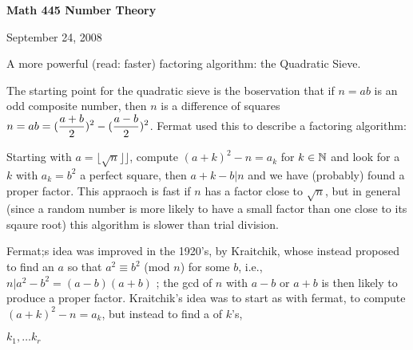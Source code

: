 





\loadmsbm

\nopagenumbers
\overfullrule=0pt


\def\ctln{\centerline}
\def\u{\underbar}
\def\ssk{\smallskip}
\def\msk{\medskip}
\def\bsk{\bigskip}
\def\dl{\displaystyle}
\def\ni{\noindent}


\ctln{\bf Math 445 Number Theory}

\medskip

\ctln{September 24, 2008}

\bigskip

A more powerful (read: faster) factoring algorithm: the Quadratic Sieve.

\ssk

The starting point for the quadratic sieve is the boservation that if $n=ab$ is an odd composite number, then 
$n$ is a difference of squares $\dl n=ab=({{a+b}\over{2}})^2-({{a-b}\over{2}})^2$. Fermat used this to describe a factoring algorithm:

\ssk

Starting with $a=\lfloor\sqrt{n}\rfloor\rfloor$, compute $(a+k)^2-n=a_k$ for $k\in{\Bbb N}$ and look for a $k$ with $a_k=b^2$ a perfect square,
then $a+k-b|n$ and we have (probably) found a proper factor. This appraoch is fast if $n$ has a factor close to $\sqrt{n}$, but in general
(since a random number is more likely to have a small factor than one close to its sqaure root) this algorithm is slower than trial division.

\msk

Fermat;s idea was improved in the 1920's, by Kraitchik, whose instead proposed to find an $a$ so that $a^2\equiv b^2$ (mod $n$) for some $b$, i.e., 
$n|a^2-b^2=(a-b)(a+b)$ ; the gcd of $n$ with $a-b$ or $a+b$ is then likely to produce a proper factor. Kraitchik's idea was to start as
with fermat, to compute $(a+k)^2-n=a_k$, but instead to find a  of $k$'s, 

\ssk

\ctln{$k_1,\ldots k_r$}

\ssk

